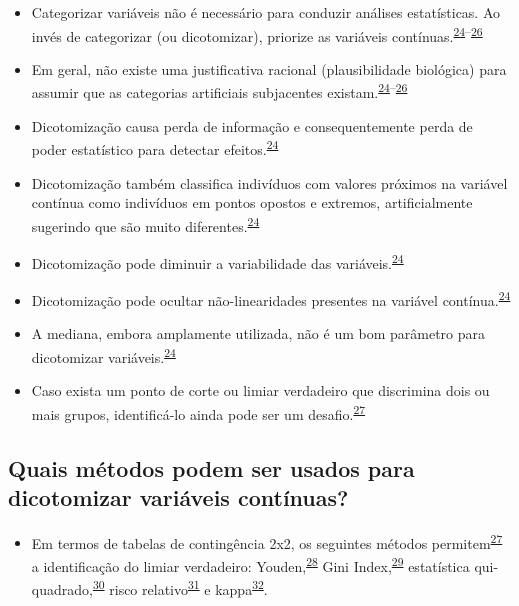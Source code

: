 \documentclass[
]{book}
\providecommand{\tightlist}{%
  \setlength{\itemsep}{0pt}\setlength{\parskip}{0pt}}
\begin{document}
\begin{itemize}
\item
  Categorizar variáveis não é necessário para conduzir análises estatísticas. Ao invés de categorizar (ou dicotomizar), priorize as variáveis contínuas.\textsuperscript{\protect\hyperlink{ref-Altman2006}{24}--\protect\hyperlink{ref-Collins2016}{26}}
\item
  Em geral, não existe uma justificativa racional (plausibilidade biológica) para assumir que as categorias artificiais subjacentes existam.\textsuperscript{\protect\hyperlink{ref-Altman2006}{24}--\protect\hyperlink{ref-Collins2016}{26}}
\item
  Dicotomização causa perda de informação e consequentemente perda de poder estatístico para detectar efeitos.\textsuperscript{\protect\hyperlink{ref-Altman2006}{24}}
\item
  Dicotomização também classifica indivíduos com valores próximos na variável contínua como indivíduos em pontos opostos e extremos, artificialmente sugerindo que são muito diferentes.\textsuperscript{\protect\hyperlink{ref-Altman2006}{24}}
\item
  Dicotomização pode diminuir a variabilidade das variáveis.\textsuperscript{\protect\hyperlink{ref-Altman2006}{24}}
\item
  Dicotomização pode ocultar não-linearidades presentes na variável contínua.\textsuperscript{\protect\hyperlink{ref-Altman2006}{24}}
\item
  A mediana, embora amplamente utilizada, não é um bom parâmetro para dicotomizar variáveis.\textsuperscript{\protect\hyperlink{ref-Altman2006}{24}}
\item
  Caso exista um ponto de corte ou limiar verdadeiro que discrimina dois ou mais grupos, identificá-lo ainda pode ser um desafio.\textsuperscript{\protect\hyperlink{ref-Prince2017}{27}}
\end{itemize}

\hypertarget{quais-muxe9todos-podem-ser-usados-para-dicotomizar-variuxe1veis-contuxednuas}{%
\subsection{Quais métodos podem ser usados para dicotomizar variáveis contínuas?}\label{quais-muxe9todos-podem-ser-usados-para-dicotomizar-variuxe1veis-contuxednuas}}

\begin{itemize}
\tightlist
\item
  Em termos de tabelas de contingência 2x2, os seguintes métodos permitem\textsuperscript{\protect\hyperlink{ref-Prince2017}{27}} a identificação do limiar verdadeiro: Youden,\textsuperscript{\protect\hyperlink{ref-YOUDEN1950}{28}} Gini Index,\textsuperscript{\protect\hyperlink{ref-strobl2007}{29}} estatística qui-quadrado,\textsuperscript{\protect\hyperlink{ref-pearson1900}{30}} risco relativo\textsuperscript{\protect\hyperlink{ref-Greiner2000}{31}} e kappa\textsuperscript{\protect\hyperlink{ref-fleiss1971}{32}}.
\end{itemize}
\end{document}
